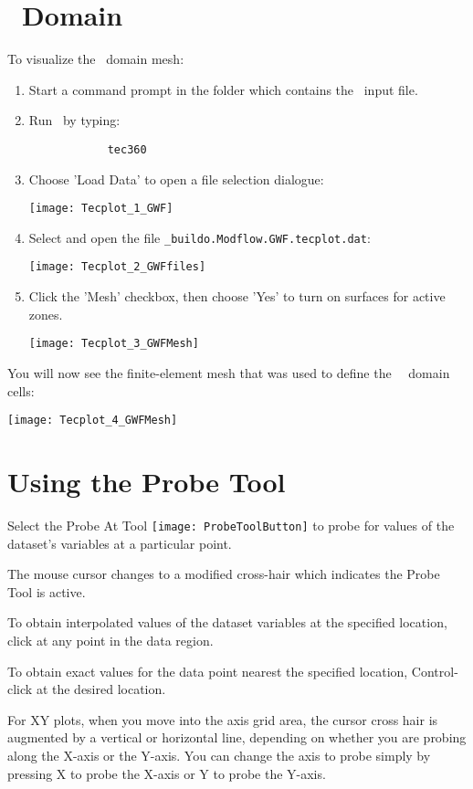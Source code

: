 \label{Appendix:TecplotUseage}
\section{\gwf\ Domain} \label{Tecplot:GWF}
To visualize the \gwf\ domain mesh:
\begin{enumerate}
    \item Start a command prompt in the folder which contains the \mut\ input file.
    \item Run \tecplot\ by typing:
        \begin{verbatim}
            tec360
        \end{verbatim}
    \item Choose 'Load Data' to open a file selection dialogue:

        \texttt{[image: Tecplot\_1\_GWF]}

    \item Select and open the file \texttt{\_buildo.Modflow.GWF.tecplot.dat}:

        \texttt{[image: Tecplot\_2\_GWFfiles]}

   \item Click the 'Mesh' checkbox, then choose 'Yes' to turn on surfaces for active zones.

        \texttt{[image: Tecplot\_3\_GWFMesh]}

\end{enumerate}
You will now see the finite-element mesh that was used to define the \mfus\ \gwf\ domain cells:

        \texttt{[image: Tecplot\_4\_GWFMesh]}

\section{Using the Probe Tool} \label{Tecplot:ProbeTool}
Select the Probe At Tool \texttt{[image: ProbeToolButton]} to probe for values of the dataset's variables at a particular point.

The mouse cursor changes to a modified cross-hair which indicates the Probe Tool is active.

To obtain interpolated values of the dataset variables at the specified location, click at any point in the data region.

To obtain exact values for the data point nearest the specified location, Control-click at the desired location.

For XY plots, when you move into the axis grid area, the cursor cross hair is augmented by a vertical or horizontal line, depending on whether you are probing along the X-axis or the Y-axis. You can change the axis to probe simply by pressing X to probe the X-axis or Y to probe the Y-axis.




